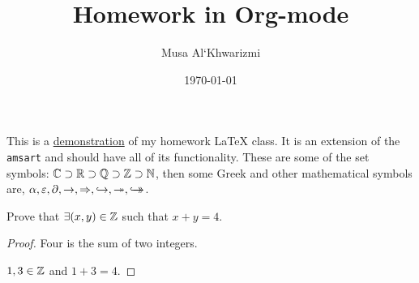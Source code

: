 \documentclass{homework}
\author{Musa Al`Khwarizmi}
\date{\today}
\title{Homework in Org-mode}
\begin{document}
\maketitle
This is a \underline{demonstration} of my homework \LaTeX{} class. It is an extension of the \texttt{amsart} and should have all of its functionality. These are some of the set symbols: \(\mathbb{C} \supset \mathbb{R} \supset \mathbb{Q} \supset \mathbb{Z} \supset \mathbb{N}\), then some Greek and other mathematical symbols are, \(\alpha, \varepsilon, \partial, \rightarrow, \Rightarrow, \hookrightarrow, \twoheadrightarrow, \hookrightarrow\mathrel{\mspace{-15mu}}\rightarrow\).


\begin{question}[99]
Prove that \(\exists (x,y) \in \mathbb{Z}\) such that \(x+y = 4\).

\begin{proof}
Four is the sum of two integers.

\(1,3 \in \mathbb{Z}\) and \(1+3=4\).
\end{proof}
\end{question}
\end{document}
